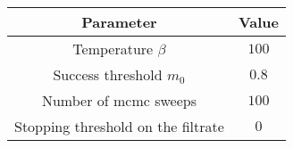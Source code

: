 \begin{tabular}{c c}
\toprule
Parameter                          & Value \\ \midrule
Temperature $\beta$                & $100$ \\
Success threshold $m_0$            & $0.8$ \\
Number of \acrshort{mcmc} sweeps   & $100$ \\
Stopping threshold on the filtrate & $0$   \\
\bottomrule
\end{tabular}